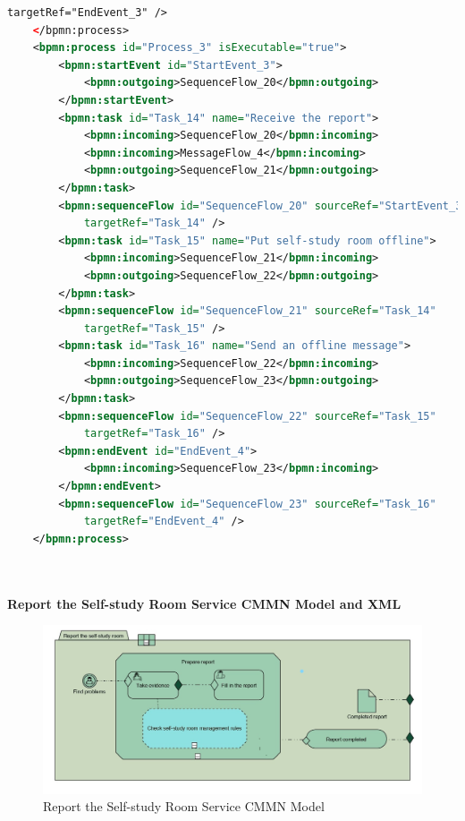 \documentclass[runningheads]{llncs}
\begin{document}
\begin{lstlisting}[language={XML}]
	        targetRef="EndEvent_3" />
	</bpmn:process>
	<bpmn:process id="Process_3" isExecutable="true">
		<bpmn:startEvent id="StartEvent_3">
	        <bpmn:outgoing>SequenceFlow_20</bpmn:outgoing>
	    </bpmn:startEvent>
		<bpmn:task id="Task_14" name="Receive the report">
	        <bpmn:incoming>SequenceFlow_20</bpmn:incoming>
			<bpmn:incoming>MessageFlow_4</bpmn:incoming>
			<bpmn:outgoing>SequenceFlow_21</bpmn:outgoing>
	    </bpmn:task>
		<bpmn:sequenceFlow id="SequenceFlow_20" sourceRef="StartEvent_3"
	        targetRef="Task_14" />
		<bpmn:task id="Task_15" name="Put self-study room offline">
	        <bpmn:incoming>SequenceFlow_21</bpmn:incoming>
			<bpmn:outgoing>SequenceFlow_22</bpmn:outgoing>
	    </bpmn:task>
		<bpmn:sequenceFlow id="SequenceFlow_21" sourceRef="Task_14"
	        targetRef="Task_15" />
		<bpmn:task id="Task_16" name="Send an offline message">
	        <bpmn:incoming>SequenceFlow_22</bpmn:incoming>
			<bpmn:outgoing>SequenceFlow_23</bpmn:outgoing>
	    </bpmn:task>
		<bpmn:sequenceFlow id="SequenceFlow_22" sourceRef="Task_15"
	        targetRef="Task_16" />
		<bpmn:endEvent id="EndEvent_4">
			<bpmn:incoming>SequenceFlow_23</bpmn:incoming>
		</bpmn:endEvent>
		<bpmn:sequenceFlow id="SequenceFlow_23" sourceRef="Task_16"
	        targetRef="EndEvent_4" />
	</bpmn:process>

    
	\end{lstlisting}
	\clearpage
	\textbf{Report the Self-study Room Service CMMN Model and XML}\\
	\begin{figure}
		\centering %
		\includegraphics[width=1.0\textwidth]{figure/llt/selfstudyroombpmn} %
		\caption{Report the Self-study Room Service CMMN Model} %
		\label{Report the Self-study Room} %
	\end{figure}
\end{document}
